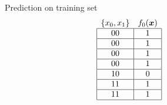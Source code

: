 \begin{figure}[!htb]
\begin{minipage}{.95\linewidth}
  \begin{minipage}[b]{.21\linewidth}\centering
    Prediction on training set
    \vspace{-0.5em}
    \begin{align*}
      \begin{array}{cc}
        \{x_0,x_1\}                    & f_0(\bm{x})              \\ \hline
        \multicolumn{1}{|c|}{00} & \multicolumn{1}{c|}{1} \\ \hline
        \multicolumn{1}{|c|}{00} & \multicolumn{1}{c|}{1} \\ \hline
        \multicolumn{1}{|c|}{00} & \multicolumn{1}{c|}{1} \\ \hline
        \multicolumn{1}{|c|}{00} & \multicolumn{1}{c|}{1} \\ \hline
        \multicolumn{1}{|c|}{10} & \multicolumn{1}{c|}{0} \\ \hline
        \multicolumn{1}{|c|}{11} & \multicolumn{1}{c|}{1} \\ \hline
        \multicolumn{1}{|c|}{11} & \multicolumn{1}{c|}{1} \\ \hline
      \end{array}
    \end{align*}
  \end{minipage}
\end{minipage}


\end{figure}
